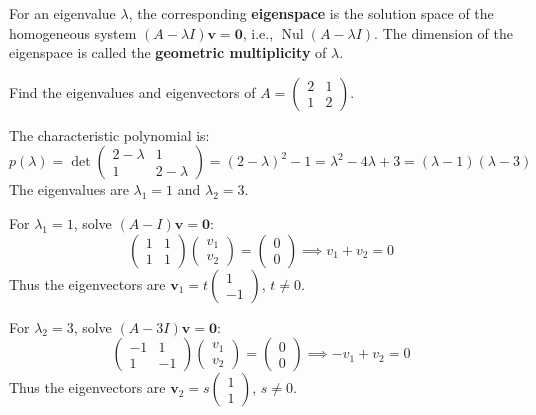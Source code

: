 \begin{definition}[Eigenspace]
For an eigenvalue $\lambda$, the corresponding \textbf{eigenspace} is the solution space of the homogeneous system $(A - \lambda I)\mathbf{v} = \mathbf{0}$, i.e., $\operatorname{Nul}(A - \lambda I)$. The dimension of the eigenspace is called the \textbf{geometric multiplicity} of $\lambda$.
\end{definition}

\begin{example}
Find the eigenvalues and eigenvectors of $A = \begin{pmatrix} 2 & 1 \\ 1 & 2 \end{pmatrix}$.

The characteristic polynomial is:
\[
p(\lambda) = \det \begin{pmatrix} 2-\lambda & 1 \\ 1 & 2-\lambda \end{pmatrix} = (2-\lambda)^2 - 1 = \lambda^2 - 4\lambda + 3 = (\lambda-1)(\lambda-3)
\]
The eigenvalues are $\lambda_1 = 1$ and $\lambda_2 = 3$.

For $\lambda_1 = 1$, solve $(A - I)\mathbf{v} = \mathbf{0}$:
\[
\begin{pmatrix} 1 & 1 \\ 1 & 1 \end{pmatrix} \begin{pmatrix} v_1 \\ v_2 \end{pmatrix} = \begin{pmatrix} 0 \\ 0 \end{pmatrix} \implies v_1 + v_2 = 0
\]
Thus the eigenvectors are $\mathbf{v}_1 = t \begin{pmatrix} 1 \\ -1 \end{pmatrix}$, $t \neq 0$.

For $\lambda_2 = 3$, solve $(A - 3I)\mathbf{v} = \mathbf{0}$:
\[
\begin{pmatrix} -1 & 1 \\ 1 & -1 \end{pmatrix} \begin{pmatrix} v_1 \\ v_2 \end{pmatrix} = \begin{pmatrix} 0 \\ 0 \end{pmatrix} \implies -v_1 + v_2 = 0
\]
Thus the eigenvectors are $\mathbf{v}_2 = s \begin{pmatrix} 1 \\ 1 \end{pmatrix}$, $s \neq 0$.
\end{example}

